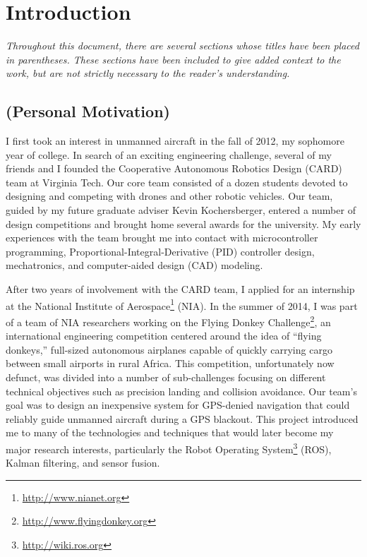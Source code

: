 \chapter{Introduction}

\textit{Throughout this document, there are several sections whose titles have been placed in parentheses. These sections have been included to give added context to the work, but are not strictly necessary to the reader's understanding.}

\section{(Personal Motivation)}

I first took an interest in unmanned aircraft in the fall of 2012, my sophomore year of college. In search of an exciting engineering challenge, several of my friends and I founded the Cooperative Autonomous Robotics Design (CARD) team at Virginia Tech. Our core team consisted of a dozen students devoted to designing and competing with drones and other robotic vehicles. Our team, guided by my future graduate adviser Kevin Kochersberger, entered a number of design competitions and brought home several awards for the university. My early experiences with the team brought me into contact with microcontroller programming, Proportional-Integral-Derivative (PID) controller design, mechatronics, and computer-aided design (CAD) modeling.

After two years of involvement with the CARD team, I applied for an internship at the National Institute of Aerospace\footnote{\url{http://www.nianet.org}} (NIA). In the summer of 2014, I was part of a team of NIA researchers working on the Flying Donkey Challenge\footnote{\url{http://www.flyingdonkey.org}}, an international engineering competition centered around the idea of ``flying donkeys,'' full-sized autonomous airplanes capable of quickly carrying cargo between small airports in rural Africa. This competition, unfortunately now defunct, was divided into a number of sub-challenges focusing on different technical objectives such as precision landing and collision avoidance. Our team's goal was to design an inexpensive system for GPS-denied navigation that could reliably guide unmanned aircraft during a GPS blackout. This project introduced me to many of the technologies and techniques that would later become my major research interests, particularly the Robot Operating System\footnote{\url{http://wiki.ros.org}} (ROS), Kalman filtering, and sensor fusion.

